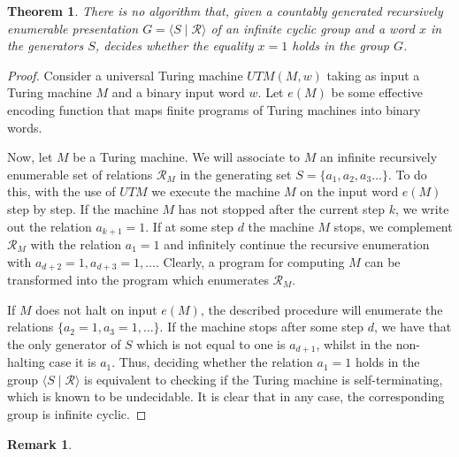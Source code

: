 \documentclass[12pt,a4paper]{amsart}
\newtheorem{theorem}{Theorem}
\newtheorem{remark}{Remark}
\begin{document}
\begin{theorem}
\label{cg_g_theorem}
    There is no algorithm that, given a countably generated recursively enumerable presentation $G=\langle S \mid \mathcal{R} \rangle$ of an infinite cyclic group and a word $x$ in the generators $S$, decides whether the equality $x=1$ holds in the group $G$.
\end{theorem}
\begin{proof}
Consider a universal Turing machine $UTM(M,w)$ taking as input a Turing machine $M$ and a binary input word $w$. Let $e(M)$ be some effective encoding function that maps finite programs of Turing machines into binary words.

Now, let $M$ be a Turing machine. We will associate to $M$ an infinite recursively enumerable set of relations $\mathcal R_M$ in the generating set $S=\{a_1,a_2,a_3\ldots\}$. To do this, with the use of $UTM$ we execute the machine $M$ on the input word $e(M)$ step by step. If the machine $M$ has not stopped after the current step $k$, we write out the relation $a_{k+1}=1$. If at some step $d$ the machine $M$ stops, we complement $\mathcal R_M$ with the relation $a_1=1$ and infinitely continue the recursive enumeration with $a_{d+2}=1, a_{d+3}=1,\ldots$. Clearly, a program for computing $M$ can be transformed into the program which enumerates $\mathcal R_M$.

\smallskip

If $M$ does not halt on input $e(M)$, the described procedure will enumerate the relations $\{a_2=1,a_3=1,\ldots\}$. If the machine stops after some step $d$, we have that the only generator of $S$ which is not equal to one is $a_{d+1}$, whilst in the non-halting case it is $a_1$. Thus, deciding whether the relation $a_1=1$ holds in the group $\langle S \mid \mathcal R\rangle$ is equivalent to checking if the Turing machine is self-terminating, which is known to be undecidable. It is clear that in any case, the corresponding group is infinite cyclic.
\end{proof}

\begin{remark}
\end{remark}
\end{document}
